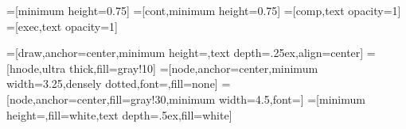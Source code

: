 =[minimum height=0.75\block]
=[cont,minimum height=0.75\block]
=[comp,text opacity=1]
=[exec,text opacity=1]

=[draw,anchor=center,minimum height=\block,text depth=.25ex,align=center]
=[hnode,ultra thick,fill=gray!10]
=[node,anchor=center,minimum width=3.25\block,densely dotted,font=\footnotesize,fill=none]
=[node,anchor=center,fill=gray!30,minimum width=4.5\block,font=\footnotesize]
=[minimum height=\block,fill=white,text depth=.5ex,fill=white]
